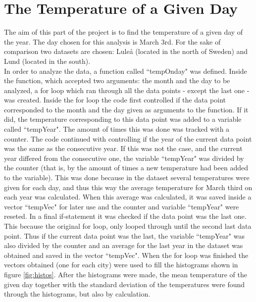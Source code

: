\documentclass[a4paper,12pt,twoside]{article}
\begin{document}
  
\section {The Temperature of a Given Day}

The aim of this part of the project is to find the temperature of a given day of the year. The day chosen for this analysis is March 3rd. For the sake of comparison two datasets are chosen: Luleå (located in the north of Sweden) and Lund (located in the south). \\

\noindent In order to analyze the data, a function called ``tempOnday" was defined. Inside the function, which accepted two arguments: the month and the day to be analyzed, a for loop which ran through all the data points - except the last one - was created. Inside the for loop the code first controlled if the data point corresponded to the month and the day given as 
arguments to the function. If it did, the temperature corresponding to this data point was added to a variable called ``tempYear". The amount of times this was done was tracked with a counter. The code continued with controlling if the year of the current data point was the same as the consecutive year. If this
was not the case, and the current year differed from the consecutive one, the variable ``tempYear" was divided by the counter (that is, by the amount of times a new temperature had been added to the variable). This was done because in the dataset several temperatures were given for each day, and thus this way 
the average temperature for March third on each year was calculated. When this average was calculated, it was saved inside a vector ``tempVec" for later use and the counter and variable ``tempYear" were reseted. In a final if-statement it was checked if the data point was the last one. This because the original for 
loop, only looped through until the second last data point. Thus if the current data point was the last, the variable ``tempYear" was also divided by the counter and an average for the last year in the dataset was obtained and saved in the vector ``tempVec". 
When the for loop was finished the vectors obtained (one for each city) were used to fill the histograms shown in figure \ref{fig:histos}. After the histograms were made, the mean temperature of the given day together with the standard deviation of the temperatures were found through the histograms, but also by calculation. \\
\end{document}
